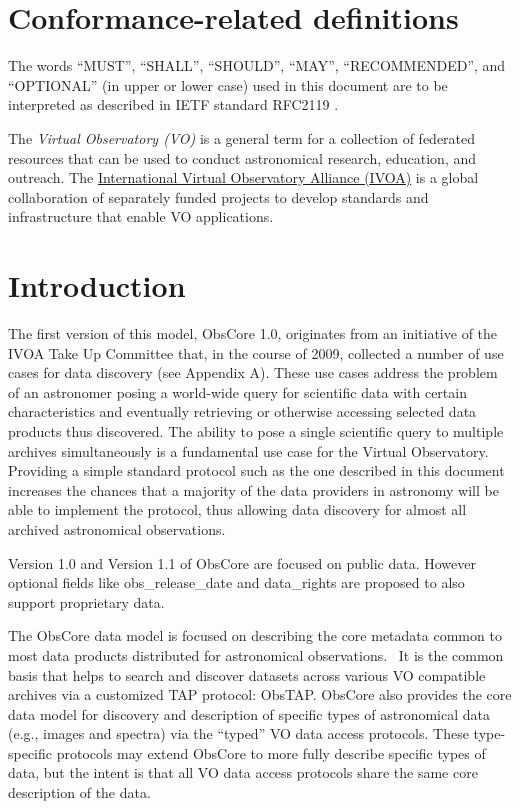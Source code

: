 \documentclass[11pt,a4paper]{ivoa}
\begin{document}
\section*{Conformance-related definitions}

The words ``MUST'', ``SHALL'', ``SHOULD'', ``MAY'', ``RECOMMENDED'', and
``OPTIONAL'' (in upper or lower case) used in this document are to be
interpreted as described in IETF standard RFC2119 \citep{std:RFC2119}.

The \emph{Virtual Observatory (VO)} is a
general term for a collection of federated resources that can be used
to conduct astronomical research, education, and outreach.
The \href{https://www.ivoa.net}{International
Virtual Observatory Alliance (IVOA)} is a global
collaboration of separately funded projects to develop standards and
infrastructure that enable VO applications.


\section{Introduction}

The first version of this model, ObsCore 1.0, originates from an initiative of the IVOA Take Up Committee that, in the
course of 2009, collected a number of use cases for data discovery (see Appendix A).  These use cases address the
problem of an astronomer posing a world-wide query for scientific data with certain characteristics and eventually
retrieving or otherwise accessing selected data products thus discovered.  The ability to pose a single scientific
query to multiple archives simultaneously is a fundamental use case for the Virtual Observatory.  Providing a simple
standard protocol such as the one described in this document increases the chances that a majority of the data
providers in astronomy will be able to implement the protocol, thus allowing data discovery for almost all archived
astronomical observations. 

Version 1.0 and Version 1.1 of ObsCore are focused on public data. However optional fields like obs\_release\_date and
data\_rights are proposed to also support proprietary data.

The ObsCore data model is focused on describing the core metadata common to most data products distributed for
astronomical observations.~ It is the common basis that helps to search and discover datasets across various VO
compatible archives via a customized TAP protocol: ObsTAP.  ObsCore also provides the core data model for discovery and
description of specific types of astronomical data (e.g., images and spectra) via the ``typed'' VO data access
protocols.  These type-specific protocols may extend ObsCore to more fully describe specific types of data, but the
intent is that all VO data access protocols share the same core description of the data.
\end{document}
